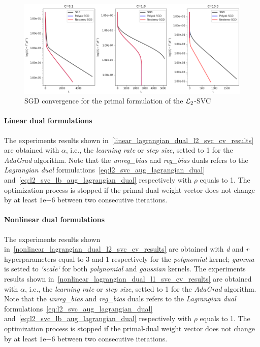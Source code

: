 

\begin{figure}[H]
	\centering
	\includegraphics[scale=0.55]{img/l2_svc_loss_history}
	\caption{SGD convergence for the primal formulation of the $\protect \mathcal{L}_2$-SVC}
	\label{fig:l2_svc_loss_history}
\end{figure}

\pagebreak

\paragraph{Linear dual formulations}

The experiments results shown in~\ref{linear_lagrangian_dual_l2_svc_cv_results} are obtained with $\alpha$, i.e., the \emph{learning rate} or \emph{step size}, setted to 1 for the \emph{AdaGrad} algorithm. Note that the \emph{unreg\_bias} and \emph{reg\_bias} duals refers to the \emph{Lagrangian dual} formulations~\eqref{eq:l2_svc_aug_lagrangian_dual} and~\eqref{eq:l2_svc_lb_aug_lagrangian_dual} respectively with $\rho$ equals to 1. The optimization process is stopped if the primal-dual weight vector does not change by at least $1\mathrm{e}{-6}$  between two consecutive iterations.



\paragraph{Nonlinear dual formulations}

The experiments results shown in~\ref{nonlinear_lagrangian_dual_l2_svc_cv_results} are obtained with \emph{d} and \emph{r} hyperparameters equal to 3 and 1 respectively for the \emph{polynomial} kernel; \emph{gamma} is setted to \emph{`scale`} for both \emph{polynomial} and \emph{gaussian} kernels. The experiments results shown in~\ref{nonlinear_lagrangian_dual_l1_svc_cv_results} are obtained with $\alpha$, i.e., the \emph{learning rate} or \emph{step size}, setted to 1 for the \emph{AdaGrad} algorithm. Note that the \emph{unreg\_bias} and \emph{reg\_bias} duals refers to the \emph{Lagrangian dual} formulations~\eqref{eq:l2_svc_aug_lagrangian_dual} and~\eqref{eq:l2_svc_lb_aug_lagrangian_dual} respectively with $\rho$ equals to 1. The optimization process is stopped if the primal-dual weight vector does not change by at least $1\mathrm{e}{-6}$  between two consecutive iterations.

